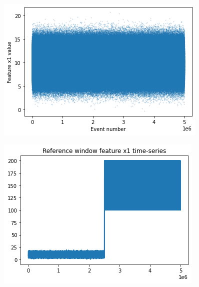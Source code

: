 \begin{center}
\begin{minipage}{.5\textwidth}
  \centering
  \includegraphics[width=1\linewidth]{figures/01-reference.png}
  \label{fig:timeseries-r1}
\end{minipage}%
\begin{minipage}{.5\textwidth}
  \centering
  \includegraphics[width=1\linewidth]{figures/01-target.png}
  \label{fig:timeseries-t1}
\end{minipage}
\end{center}

